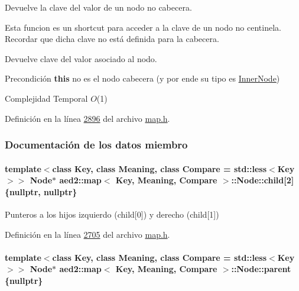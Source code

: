 Devuelve la clave del valor de un nodo no cabecera. 

Esta funcion es un shortcut para acceder a la clave de un nodo no centinela. Recordar que dicha clave no está definida para la cabecera.

\begin{DoxyReturn}{Devuelve}
clave del valor asociado al nodo.
\end{DoxyReturn}
\begin{DoxyPrecond}{Precondición}
{\bfseries this} no es el nodo cabecera (y por ende su tipo es \hyperlink{structaed2_1_1map_1_1InnerNode}{Inner\-Node})
\end{DoxyPrecond}

\begin{DoxyDescription}
\item[Complejidad Temporal]$O$(1)
\end{DoxyDescription}

Definición en la línea \hyperlink{map_8h_source_l02896}{2896} del archivo \hyperlink{map_8h_source}{map.\-h}.



\subsubsection{Documentación de los datos miembro}
\hypertarget{structaed2_1_1map_1_1Node_a7d65c374c73c443a46d8fc224aff9e82_a7d65c374c73c443a46d8fc224aff9e82}{
\paragraph[{child}]{\setlength{\rightskip}{0pt plus 5cm}template$<$class Key, class Meaning, class Compare = std\-::less$<$\-Key$>$$>$ {\bf Node}$\ast$ {\bf aed2\-::map}$<$ Key, Meaning, Compare $>$\-::Node\-::child\mbox{[}2\mbox{]} \{nullptr, nullptr\}}}\label{structaed2_1_1map_1_1Node_a7d65c374c73c443a46d8fc224aff9e82_a7d65c374c73c443a46d8fc224aff9e82}


Punteros a los hijos izquierdo (child\mbox{[}0\mbox{]}) y derecho (child\mbox{[}1\mbox{]}) 



Definición en la línea \hyperlink{map_8h_source_l02705}{2705} del archivo \hyperlink{map_8h_source}{map.\-h}.

\hypertarget{structaed2_1_1map_1_1Node_ab6a5f9e471b311755e4a56834086cb90_ab6a5f9e471b311755e4a56834086cb90}{
\paragraph[{parent}]{\setlength{\rightskip}{0pt plus 5cm}template$<$class Key, class Meaning, class Compare = std\-::less$<$\-Key$>$$>$ {\bf Node}$\ast$ {\bf aed2\-::map}$<$ Key, Meaning, Compare $>$\-::Node\-::parent \{nullptr\}}}\label{structaed2_1_1map_1_1Node_ab6a5f9e471b311755e4a56834086cb90_ab6a5f9e471b311755e4a56834086cb90}


